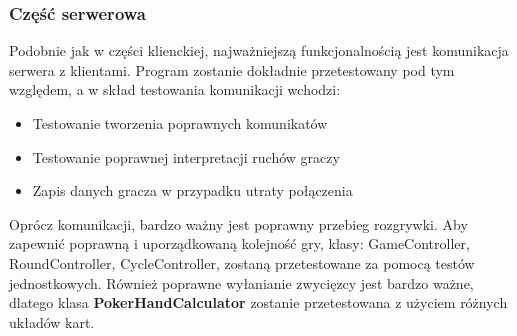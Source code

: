 \documentclass{article}
\begin{document}
        \subsubsection{Część serwerowa}
            Podobnie jak w części klienckiej, najważniejszą funkcjonalnością jest komunikacja serwera z klientami.
            Program zostanie dokładnie przetestowany pod tym względem, a w skład testowania komunikacji wchodzi:
            \begin{itemize}
                \item Testowanie tworzenia poprawnych komunikatów
                \item Testowanie poprawnej interpretacji ruchów graczy
                \item Zapis danych gracza w przypadku utraty połączenia
            \end{itemize}
            Oprócz komunikacji, bardzo ważny jest poprawny przebieg rozgrywki.
            Aby zapewnić poprawną i uporządkowaną kolejność gry, klasy: GameController, RoundController, CycleController, zostaną przetestowane za pomocą testów jednostkowych.
            Również poprawne wyłanianie zwycięzcy jest bardzo ważne, dlatego klasa \textbf{PokerHandCalculator} zostanie przetestowana z użyciem różnych układów kart.
\end{document}
